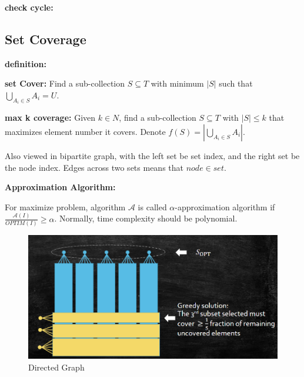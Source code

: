 \textbf{check cycle:}

\subsection{Set Coverage}
\textbf{definition:}

\textbf{set Cover:} 
Find a sub-collection $S \subseteq T$ with minimum $|S|$ such that $\bigcup_{A_i\in S}A_i=U$.

\textbf{max k coverage:} 
Given $k \in N$, find a sub-collection $S\subseteq T$ with $|S|\leq k$ that maximizes element number it covers. Denote $f(S)=|\bigcup _{A_i\in S}A_i|$.

Also viewed in bipartite graph, with the left set be set index, and the right set be the node index. Edges across two sets means that $node \in set$.
\begin{remark}
\textbf{Approximation Algorithm:}

For maximize problem, algorithm $\mathcal{A} $ is called $\alpha$-approximation algorithm if $\frac{\mathcal{A}(I)}{OPTIM(I)}\geq \alpha$. Normally, time complexity should be polynomial.
\end{remark}

\begin{figure}
	\centering
    \includegraphics[width=0.8\linewidth]{Notes/fig/setcover.png}
    \caption{Directed Graph}
    \label{fig:setcover}
\end{figure}

